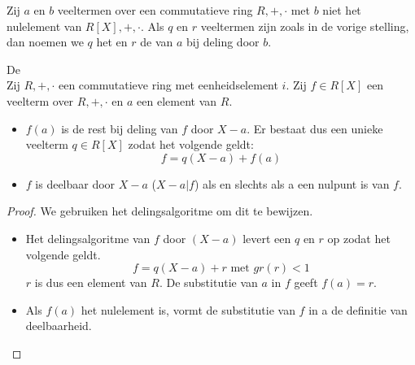 \documentclass[main.tex]{subfiles}
\begin{document}
\begin{de}
  Zij $a$ en $b$ veeltermen over een commutatieve ring $R,+,\cdot$ met $b$ niet het nulelement van $R[X],+,\cdot$.
  Als $q$ en $r$ veeltermen zijn zoals in de vorige stelling, dan noemen we $q$ het  en $r$ de  van $a$ bij deling door $b$.
\end{de}

\begin{st}
  \label{st:reststelling}
  De \\
  Zij $R,+,\cdot$ een commutatieve ring met eenheidselement $i$.
  Zij $f\in R[X]$ een veelterm over $R,+,\cdot$ en $a$ een element van $R$.
  \begin{itemize}
  \item  $f(a)$ is de rest bij deling van $f$ door $X-a$. Er bestaat dus een unieke veelterm $q\in R[X]$ zodat het volgende geldt:
    \[ f = q(X-a) + f(a) \]
  \item $f$ is deelbaar door $X-a$ ($X-a|f$) als en slechts als a een nulpunt is van $f$.
  \end{itemize}

  \begin{proof}
    We gebruiken het delingsalgoritme om dit te bewijzen.
    \begin{itemize}
    \item Het delingsalgoritme van $f$ door $(X-a)$ levert een $q$ en $r$ op zodat het volgende geldt.
      \[ f = q(X-a) + r \text{ met } gr(r) < 1 \]
      $r$ is dus een element van $R$.
      De substitutie van $a$ in $f$ geeft $f(a) = r$.
    \item Als $f(a)$ het nulelement is, vormt de substitutie van $f$ in a de definitie van deelbaarheid.
    \end{itemize}
  \end{proof}
\end{st}
\end{document}
